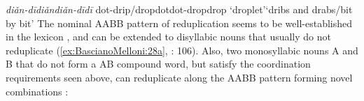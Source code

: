 \documentclass[output=paper]{langsci/langscibook}
\begin{document}
\ex\label{ex:BascianoMelloni:27b}%
        {\emph{diǎn-dī}}{\emph{diǎn\tld{}diǎn-dī\tld{}dī}}%
        {dot-drip/drop}{dot\emph{\tld{}}dot-drop\emph{\tld{}}drop}%
        {`droplet'}{`dribs and drabs/bit by bit'}%
\z\z
The nominal AABB pattern of reduplication seems to be well-established
in the  lexicon %
\citep[see e.g.][]{Hu95,Wu01}%
%
, and can be
extended to disyllabic nouns that usually do not reduplicate (\ref{ex:BascianoMelloni:28a}, %
\citealt{Hu95}%
%
: 106). Also, two monosyllabic nouns A and B that do not form a AB
compound word, but satisfy the coordination requirements seen above, can
reduplicate along the AABB pattern forming novel combinations %
\citep[\ref{ex:BascianoMelloni:28b}, see][12]{Wu01}%
%
:

\end{document}
